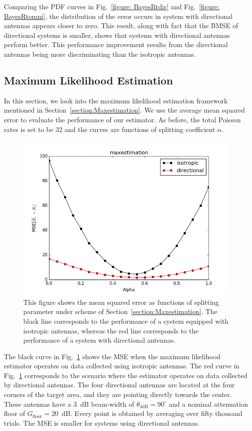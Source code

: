 Comparing the PDF curves in Fig.~\ref{figure: BayesRtdir} and Fig.~\ref{figure: BayesRtomni}, the distribution of the error occurs in system with directional antennas appears closer to zero.
This result, along with fact that the BMSE of directional systems is smaller, shows that systems with directional antennas perform better.
This performance improvement results from the directional antennas being more discriminating than the isotropic antennas. 


\subsection{Maximum Likelihood Estimation}

In this section, we look into the maximum likelihood estimation framework mentioned in Section~\ref{section:Maxestimation}.
We use the average mean squared error to evaluate the performance of our estimator.
As before, the total Poisson rates is set to be 32 and the curves are functions of splitting coefficient $\alpha$.
\begin{figure}[]
	\centering
	\includegraphics[scale=0.6]{Figures/MaxRt.png}
	\caption{This figure shows the mean squared error as functions of splitting parameter under scheme of Section~\ref{section:Maxestimation}.
The black line corresponds to the performance of a system equipped with isotropic antennas, whereas the red line corresponds to the performance of a system with directional antennas. }
	\label{figure: MaxRt}
\end{figure}
The black curve in Fig.~\ref{figure: MaxRt} shows the MSE when the maximum likelihood estimator operates on data collected using isotropic antennas.
The red curve in Fig.~\ref{figure: MaxRt} corresponds to the scenario where the estimator operates on data collected by directional antennas.
The four directional antennas are located at the four corners of the target area, and they are pointing directly towards the center.
These antennas have a 3~dB beam-width of $\theta_{\mathrm{3dB}} = 90^{\circ}$ and a nominal attenuation floor of $G_{\mathrm{floor}} = 20$~dB.
Every point is obtained by averaging over fifty thousand trials.
The MSE is smaller for systems using directional antennas.

